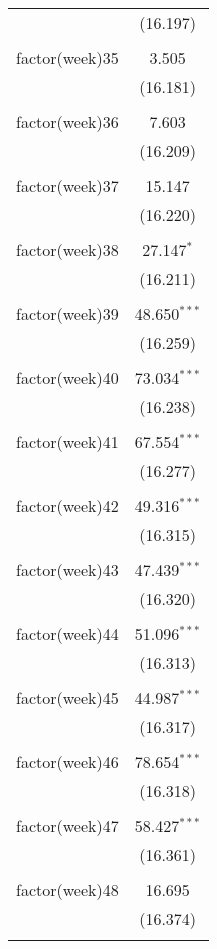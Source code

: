 \documentclass{article}
\begin{document}
\begin{table}[!htbp]
\begin{tabular}{@{\extracolsep{5pt}}lc}
  & (16.197) \\ 
  & \\ 
 factor(week)35 & 3.505 \\ 
  & (16.181) \\ 
  & \\ 
 factor(week)36 & 7.603 \\ 
  & (16.209) \\ 
  & \\ 
 factor(week)37 & 15.147 \\ 
  & (16.220) \\ 
  & \\ 
 factor(week)38 & 27.147$^{*}$ \\ 
  & (16.211) \\ 
  & \\ 
 factor(week)39 & 48.650$^{***}$ \\ 
  & (16.259) \\ 
  & \\ 
 factor(week)40 & 73.034$^{***}$ \\ 
  & (16.238) \\ 
  & \\ 
 factor(week)41 & 67.554$^{***}$ \\ 
  & (16.277) \\ 
  & \\ 
 factor(week)42 & 49.316$^{***}$ \\ 
  & (16.315) \\ 
  & \\ 
 factor(week)43 & 47.439$^{***}$ \\ 
  & (16.320) \\ 
  & \\ 
 factor(week)44 & 51.096$^{***}$ \\ 
  & (16.313) \\ 
  & \\ 
 factor(week)45 & 44.987$^{***}$ \\ 
  & (16.317) \\ 
  & \\ 
 factor(week)46 & 78.654$^{***}$ \\ 
  & (16.318) \\ 
  & \\ 
 factor(week)47 & 58.427$^{***}$ \\ 
  & (16.361) \\ 
  & \\ 
 factor(week)48 & 16.695 \\ 
  & (16.374) \\ 
  & \\ 

\end{tabular}
\end{table}
\end{document}
